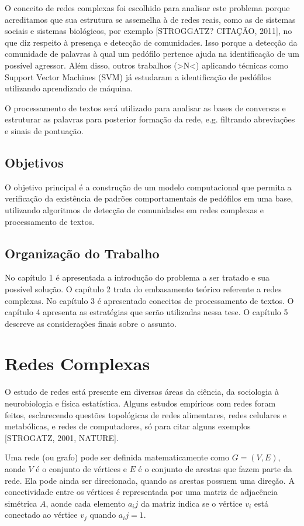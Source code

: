 \documentclass[xindy,rascunho]{fei}
\begin{document}
O conceito de redes complexas foi escolhido para analisar este problema porque acreditamos que sua estrutura se assemelha à de redes reais, como as de sistemas sociais e sistemas biológicos, por exemplo [STROGGATZ? CITAÇÃO, 2011], no que diz respeito à presença e detecção de comunidades. Isso porque a detecção da comunidade de palavras à qual um pedófilo pertence ajuda na identificação de um possível agressor. Além disso, outros trabalhos (>N<) aplicando técnicas como Support Vector Machines (SVM) já estudaram a identificação de pedófilos utilizando aprendizado de máquina.

O processamento de textos será utilizado para analisar as bases de conversas e estruturar as palavras para posterior formação da rede, e.g. filtrando abreviações e sinais de pontuação.

\section{Objetivos}

O objetivo principal é a construção de um modelo computacional que permita a verificação da existência de padrões comportamentais de pedófilos em uma base, utilizando algoritmos de detecção de comunidades em redes complexas e processamento de textos.

\section{Organização do Trabalho}

No capítulo 1 é apresentada a introdução do problema a ser tratado e sua possível solução. O capítulo 2 trata do embasamento teórico referente a redes complexas. No capítulo 3 é apresentado conceitos de processamento de textos. O capítulo 4 apresenta as estratégias que serão utilizadas nessa tese. O capítulo 5 descreve as considerações finais sobre o assunto.

\chapter{Redes Complexas}

O estudo de redes está presente em diversas áreas da ciência, da sociologia à neurobiologia e física estatística. Alguns estudos empíricos com redes foram feitos, esclarecendo questões topológicas de redes alimentares, redes celulares e metabólicas, e redes de computadores, só para citar alguns exemplos [STROGATZ, 2001, NATURE].

Uma rede (ou grafo) pode ser definida matematicamente como $ G= (V,E) $, aonde $V$ é o conjunto de vértices e $E$ é o conjunto de arestas que fazem parte da rede. Ela pode ainda ser direcionada, quando as arestas possuem uma direção. A conectividade entre os vértices é representada por uma matriz de adjacência simétrica $A$, aonde cada elemento $a_ij$ da matriz indica se o vértice $v_i$ está conectado ao vértice $v_j$ quando $a_ij=1$.
\end{document}
